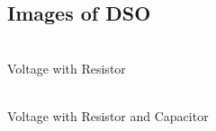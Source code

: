 \documentclass{article}
\begin{document}
\subsection{Images of DSO}
\vspace{5px}
\begin{multicols}{2}
\begin{center}
 \\ \vspace{5px}
Voltage with Resistor\\

\columnbreak

 \\ \vspace{5px}
Voltage with Resistor and Capacitor
\end{center}
\end{multicols}
\end{document}
